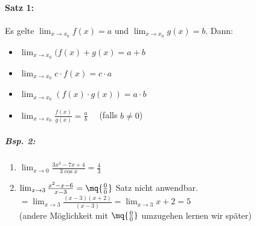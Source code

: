 \paragraph{Satz 1:} Es gelte $\lim_{x\to x_0} f(x) = a$ und $\lim_{x\to x_0} g(x) = b$. Dann:
\begin{itemize}
\item $\lim_{x\to x_0} (f(x)+g(x) = a+b$
\item $\lim_{x\to x_0} c \cdot f(x) = c \cdot a$
\item $\lim_{x\to x_0} (f(x) \cdot g(x)) = a \cdot b$
\item $\lim_{x\to x_0}\frac{f(x)}{g(x)}=\frac{a}{b} \quad $ (falls $b\not = 0$)
\end{itemize}
\subparagraph{Bsp. 2:}
\begin{enumerate}[label=\alph*.)]
\item $\lim_{x\to 0} \frac{3x^3-7x+4}{3 \cos x} = \frac{4}{3}$
\item $\lim_{x\to 3} \frac{x^2-x-6}{x-3}=\mq{\frac{0}{0}}$ Satz nicht anwendbar.\\
$= \lim_{x\to 3} \frac{(x-3)(x+2)}{(x-3)} = \lim_{x\to 3} x+2 = 5$\\
(andere Möglichkeit mit $\mq{\frac{0}{0}}$ umzugehen lernen wir später)
\end{enumerate}

